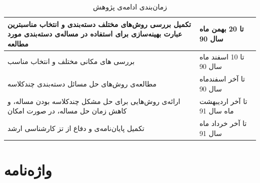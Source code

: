 \documentclass[11pt]{article}
\begin{document}
\begin{table}
\caption{زمان‌بندی ادامه‌ی پژوهش}
\label{table:schedule}
\begin{center}
\begin{tabular}{|p{8cm}|p{3cm}|}
\hline
\hline
تکمیل بررسی روش‌های مختلف دسته‌بندی و انتخاب مناسبترین عبارت بهینه‌سازی برای استفاده در مساله‌ی دسته‌بندی مورد مطالعه & تا 20 بهمن ماه سال 90\\
\hline
بررسی {}‌های مکانی مختلف و انتخاب {} مناسب & تا 10 اسفند ماه سال 90\\

\hline
مطالعه‌ی روش‌های حل مسائل دسته‌بندی چندکلاسه & تا آخر اسفندماه سال 90\\
\hline
ارائه‌ی روش‌هایی برای حل مشکل چندکلاسه بودن مساله، \knowledgetransfer{} و کاهش زمان حل مساله، در صورت امکان& تا آخر اردیبهشت ماه سال 91\\

\hline
تکمیل پایان‌نامه‌ی و دفاع از تز کارشناسی ارشد& تا آخر خرداد ماه سال 91\\

\hline
\hline

\end{tabular}
\end{center}
\end{table}


\linespread{1}
\small
\setlength{\parskip}{0pt}
\setlength{\parsep}{0pt}


\newpage

\Persian
\section*{واژه‌نامه}
\begin{LTR}
\begin{multicols}{3}
\theendnotes 
\end{multicols}
\end{LTR}
\end{document}
